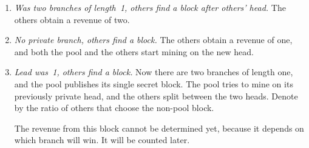 \documentclass[letterpaper]{llncs}
\begin{document}
\begin{enumerate}[label=(\alph*)]
\centerline{
    {\Large \hspace{0.0cm}  \hspace{0.0cm}}
}

\vspace{0.5\baselineskip}

\item \emph{Was two branches of length~1, others find a block after others' head.} 
The others obtain a revenue of two. \label{itm:othersOthersZeroPrime}

\vspace{0.5\baselineskip}

\centerline{
    {\Large \hspace{0.0cm}  \hspace{0.0cm}}
}

\vspace{0.5\baselineskip}

\item \emph{No private branch, others find a block.} The others obtain a revenue of one, and both the pool and the others start mining on the new head. \label{itm:others0}

\item \emph{Lead was~1, others find a block.} Now there are two branches of length one, and the pool publishes its single secret block. The pool tries to mine on its previously private head, and the others split between the two heads. Denote by  the ratio of others that choose the non-pool block. 

The revenue from this block cannot be determined yet, because it depends on which branch will win. It will be counted later. \label{itm:others1}

\vspace{0.5\baselineskip}

\centerline{
    {\Large \hspace{0.0cm}  \hspace{0.0cm}}
    {\Large \hspace{0.0cm}  \hspace{0.0cm}}
}


\end{enumerate}
\end{document}
